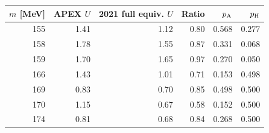 \begin{tabular}{rrrrrr}
\toprule
$m$ [MeV] & APEX $U$ & 2021 full equiv. $U$ & Ratio & $p_{\rm A}$ & $p_{\rm H}$ \\
\midrule
155 & 1.41 & 1.12 & 0.80 & 0.568 & 0.277 \\
158 & 1.78 & 1.55 & 0.87 & 0.331 & 0.068 \\
159 & 1.70 & 1.65 & 0.97 & 0.270 & 0.050 \\
166 & 1.43 & 1.01 & 0.71 & 0.153 & 0.498 \\
169 & 0.83 & 0.70 & 0.85 & 0.498 & 0.500 \\
170 & 1.15 & 0.67 & 0.58 & 0.152 & 0.500 \\
174 & 0.81 & 0.68 & 0.84 & 0.268 & 0.500 \\
\bottomrule
\end{tabular}
